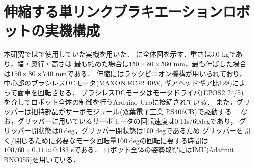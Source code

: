         
        \section{伸縮する単リンクブラキエーションロボットの実機構成}
          
          本研究では\cite{Hijiri:Robomech2024}で使用していた実機を用いた．
          に全体図を示す．重さは3.0 kgであり，幅・奥行・高さは
          最も縮めた場合は$150{\times}80{\times}560$ mm，最も伸ばした場合は$150{\times}80{\times}740$ mmである．
          伸縮にはラックピニオン機構が用いられており，中心部のブラシレスDCモータ(MAXON EC22 40W, ギアヘッドギア比128)によって歯車を回転させる．
          ブラシレスDCモータはモータドライバ(EPOS2 24/5)を介してロボット全体の制御を行うArduino Unoに接続されている．
          また，グリッパーは把持部品がサーボモジュール(双葉電子工業 RS406CB)で駆動する．
          なお，グリッパーに用いているサーボモータの回転速度は0.11s/60degであり，
          グリッパー開状態は0 deg，グリッパー閉状態は100 degであるため
          グリッパーを開く/閉じるために必要なモータ回転量100 degの回転に要する時間は
          $100/60\times0.11\approx$0.183 sである．
          ロボット全体の姿勢取得にはIMU(Adafruit BNO055)を用いている．
          

            